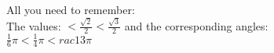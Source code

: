 \documentclass[preview]{standalone}
\begin{document}
\begin{center}
All you need to remember: \\ The values: $  < \frac{\sqrt{2}}{2} < \frac{\sqrt{3}}{2} $ and the corresponding angles: \\ $ \frac{1}{6} \pi < \frac{1}{4} \pi < rac{1}{3} \pi $
\end{center}
\end{document}
